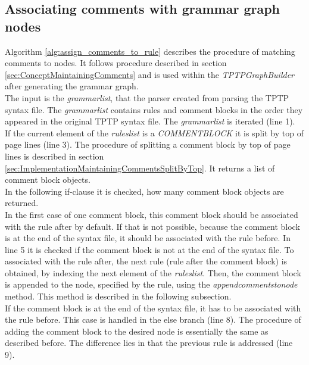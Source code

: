 \subsection{Associating comments with grammar graph nodes}\label{sec:ImplementationMaintainingCommentsAssociateWithNodes}

Algorithm \ref{alg:assign_comments_to_rule} describes the procedure of matching comments to nodes. It follows procedure described in section \ref{sec:ConceptMaintainingComments} and is used within the \textit{TPTPGraphBuilder} after generating the grammar graph.\\
The input is the \textit{grammar\textunderscore list}, that the parser created from parsing the \ac{TPTP} syntax file.
The \textit{grammar\textunderscore list} contains rules and comment blocks in the order they appeared in the original \ac{TPTP} syntax file.
The \textit{grammar\textunderscore list} is iterated (line 1).\\
If the current element of the \textit{rules\textunderscore list} is a \textit{COMMENT\textunderscore BLOCK} it is split by top of page lines (line 3).
The procedure of splitting a comment block by top of page lines is described in section \ref{sec:ImplementationMaintainingCommentsSplitByTop}.
It returns a list of comment block objects.\\
In the following if-clause it is checked, how many comment block objects are returned.\\
In the first case of one comment block, this comment block should be associated with the rule after by default. If that is not possible, because the comment block is at the end of the syntax file, it should be associated with the rule before.
In line 5 it is checked if the comment block is not at the end of the syntax file. To associated with the rule after, the next rule (rule after the comment block) is obtained, by indexing the next element of the \textit{rules\textunderscore list}.
Then, the comment block is appended to the node, specified by the rule, using the \textit{append\textunderscore comments\textunderscore to\textunderscore node} method. This method is described in the following subsection.\\
If the comment block is at the end of the syntax file, it has to be associated with the rule before.
This case is handled in the else branch (line 8).
The procedure of adding the comment block to the desired node is essentially the same as described before. The difference lies in that the previous rule is addressed (line 9).\\
